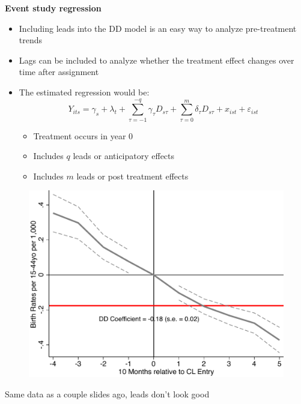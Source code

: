 \documentclass[notes=show]{beamer}
\begin{document}
\begin{frame}[plain]
	\begin{center}
	\textbf{Event study regression}
	\end{center}
	
	\begin{itemize}
	\item Including leads into the DD model is an easy way to analyze pre-treatment trends
	\item Lags can be included to analyze whether the treatment effect changes over time after assignment
	\item The estimated regression would be:$$Y_{its} = \gamma_s + \lambda_t + \sum_{\tau=-1}^{-q}\gamma_{\tau}D_{s\tau} + \sum_{\tau=0}^m\delta_{\tau}D_{s\tau}+x_{ist}+\varepsilon_{ist}$$
		\begin{itemize}
		\item Treatment occurs in year 0
		\item Includes $q$ leads or anticipatory effects
		\item Includes $m$ leads or post treatment effects
		\end{itemize}
	\end{itemize}
\end{frame}



\begin{frame}[plain]
	\begin{figure}
	\includegraphics[scale=0.5]{./lecture_includes/br1544.pdf}
	\end{figure}
	
Same data as a couple slides ago, leads don't look good
	
\end{frame}
\end{document}
